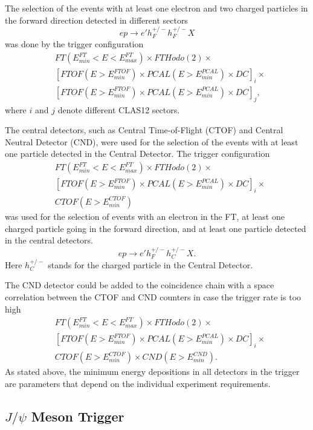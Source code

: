 The selection of the events with at least one electron and two charged particles in the forward direction
detected in different sectors
$$
ep\to e' h^{+/-}_F h^{+/-}_F X
$$ 
was done by the trigger configuration
 \begin{align*} 
 &FT(E^{FT}_{min}{<}E{<}E^{FT}_{max}) \times FTHodo(2)\times\\
 & [FTOF(E{>}E^{FTOF}_{min})\times  PCAL(E{>}E^{PCAL}_{min})\times   DC]_i \times \\
 & [FTOF(E{>}E^{FTOF}_{min})\times  PCAL(E{>}E^{PCAL}_{min})\times   DC]_j,
\end{align*}
where $i$ and $j$ denote different CLAS12 sectors. 
 
The central detectors, such as Central Time-of-Flight (CTOF) and Central Neutral Detector (CND), were used
for the selection of the events with at least one  particle detected in the Central Detector. The trigger
configuration
 \begin{align*} 
 &FT(E^{FT}_{min}{<}E{<}E^{FT}_{max}) \times FTHodo(2)\times\\
 & [FTOF(E{>}E^{FTOF}_{min})\times  PCAL(E{>}E^{PCAL}_{min})\times   DC]_i \times \\
 & CTOF(E{>}E^{CTOF}_{min})\end{align*}
\noindent
was used for the selection of events with an electron in the FT, at least one charged particle going in the forward
direction, and at least one particle detected in the central detectors. 
$$
ep\to e' h^{+/-}_F  h^{+/-}_C X.
$$
Here $h^{+/-}_C$ stands for the charged particle in the Central Detector.

The CND detector could be  added to the coincidence chain with a space correlation between the CTOF and
CND counters in case the trigger rate is too high
 \begin{align*} 
 &FT(E^{FT}_{min}{<}E{<}E^{FT}_{max})\times FTHodo(2)\times \\
 & [FTOF(E{>}E^{FTOF}_{min})\times  PCAL(E{>}E^{PCAL}_{min})\times   DC]_i \times \\
 & CTOF(E{>}E^{CTOF}_{min})\times  CND(E{>}E^{CND}_{min}).
\end{align*}
\noindent
As stated above, the minimum energy depositions in all detectors in the trigger are parameters that depend
on the individual experiment requirements.

\subsection{$J/\psi$ Meson Trigger}
\label{sec:meson_trigger}

